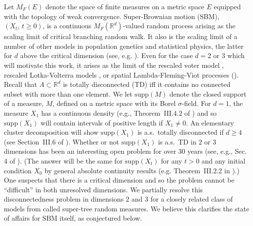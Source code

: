\documentclass[12pt]{article}
\numberwithin{theorem}{section}
\theoremstyle{def}
\numberwithin{equation}{section}
\newcommand{\R}{\mathbb{R}}
\newcommand{\supp}{\mathrm{supp}}
\begin{document}
Let $M_F(E)$ denote the space of finite measures on a metric space $E$ equipped with the topology of weak convergence. 
Super-Brownian motion (SBM), $(X_t,\, t\ge 0)$, is a continuous $M_F(\R^d)$-valued random process arising as the scaling limit of critical branching random walk. 
It also is the scaling limit of a number of other models in population genetics and statistical physics, the latter for $d$ above the critical dimension (see, e.g. \cite{S99,HS03}).  
Even for the case $d=2\text{ or }3$ which will motivate this work, it arises as the limit of the rescaled voter model \cite{CDP02}, rescaled Lotka-Volterra models \cite{CMP10}, or spatial Lambda-Fleming-Viot processes (\cite{CE18,CP20}). 
Recall that $A\subset\R^d$ is totally disconnected (TD) iff it contains no connected subset with more than one element. 
We let $\supp(M)$ denote the closed support of a measure, $M$,  defined on a metric space with its Borel $\sigma$-field. 
For $d=1$, the measure $X_1$ has a continuous density (e.g., Theorem~III.4.2 of \cite{Per02}) and so $\supp(X_1)$ will contain intervals of positive length if $X_1\neq 0$. 
An elementary cluster decomposition will show $\supp(X_1)$ is a.s.\ totally disconnected if $d\ge 4$ (see Section~III.6 of \cite{Per02}).
 Whether or not $\supp(X_1)$ is a.s.\ TD in $2$ or $3$ dimensions has been an interesting open problem for over $30$ years (see, e.g., Sec. 4 of \cite{P95}).
  (The answer will be the same for $\supp(X_t)$ for any $t>0$ and any initial condition $X_0$ by general absolute continuity results (e.g. Theorem~III.2.2 in \cite{Per02}).)
  One suspects that there is a critical dimension and so the problem cannot be ``difficult'' in both unresolved dimensions.  
  We partially resolve this disconnectedness problem in dimensions $2$ and $3$ for a closely related class of models from \cite{ADHP} called super-tree random measures.
   We believe this clarifies the state of affairs for SBM itself, as conjectured below.  
\end{document}
